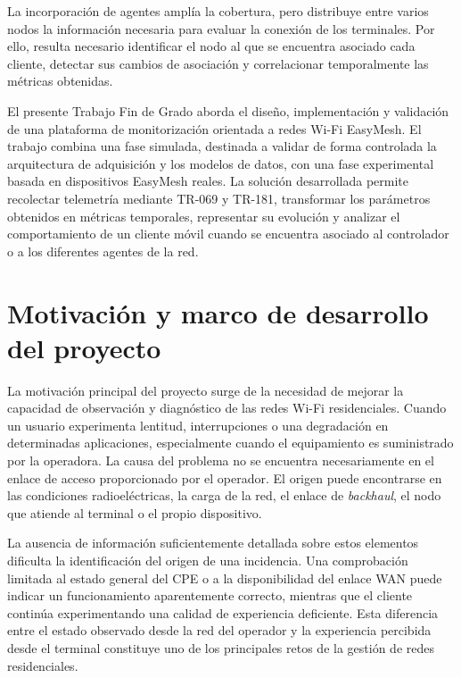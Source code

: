 La incorporación de agentes amplía la cobertura, pero distribuye entre varios nodos la 
información necesaria para evaluar la conexión de los terminales. Por ello, resulta 
necesario identificar el nodo al que se encuentra asociado cada cliente, detectar sus 
cambios de asociación y correlacionar temporalmente las métricas obtenidas.

El presente Trabajo Fin de Grado aborda el diseño, implementación y validación de una 
plataforma de monitorización orientada a redes Wi-Fi EasyMesh. El trabajo combina una 
fase simulada, destinada a validar de forma controlada la arquitectura de adquisición 
y los modelos de datos, con una fase experimental basada en dispositivos EasyMesh reales. 
La solución desarrollada permite recolectar telemetría mediante TR-069 y TR-181, 
transformar los parámetros obtenidos en métricas temporales, representar su evolución 
y analizar el comportamiento de un cliente móvil cuando se encuentra asociado al controlador 
o a los diferentes agentes de la red.

\section{Motivación y marco de desarrollo del proyecto}
\label{sec:motivacion-marco}

La motivación principal del proyecto surge de la necesidad de mejorar la capacidad de observación 
y diagnóstico de las redes Wi-Fi residenciales. Cuando un usuario experimenta lentitud, 
interrupciones o una degradación en determinadas aplicaciones, especialmente
cuando el equipamiento es suministrado por la operadora. 
La causa del problema no se encuentra 
necesariamente en el enlace de acceso proporcionado por el operador. El origen puede encontrarse 
en las condiciones radioeléctricas, la carga de la red, el enlace de \textit{backhaul}, 
el nodo que atiende al terminal o el propio dispositivo.

La ausencia de información suficientemente detallada sobre estos elementos dificulta la identificación 
del origen de una incidencia. Una comprobación limitada al estado general del CPE 
o a la disponibilidad del enlace WAN puede indicar un funcionamiento aparentemente correcto, 
mientras que el cliente continúa experimentando una calidad de experiencia deficiente. 
Esta diferencia entre el estado observado desde la red del operador y la experiencia percibida desde 
el terminal constituye uno de los principales retos de la gestión de redes residenciales.

